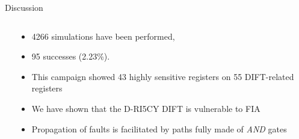\begin{frame}{Discussion}
    \begin{columns}
        \begin{column}{.15\linewidth}
            \hfill
        \end{column}
        \begin{column}{.7\linewidth}
            \begin{itemize}
                [triangle]
                \item 4266 simulations have been performed,
                \item 95 successes (2.23\%).
                \item This campaign showed 43 highly sensitive registers on 55 DIFT-related registers
                \item We have shown that the D-RI5CY DIFT is vulnerable to FIA
                \item Propagation of faults is facilitated by paths fully made of \textit{AND} gates
            \end{itemize}
        \end{column}
        \begin{column}{.15\linewidth}
            \hfill
        \end{column}
    \end{columns}
\end{frame}
